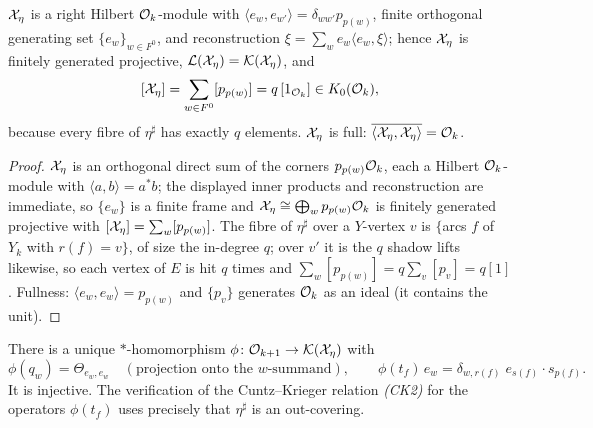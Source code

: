 \begin{lemma}\label{XVI:lem:fgp}
$\mathcal{X}_\eta$ is a right Hilbert $\mathcal{O}_k$-module with $\langle e_w,e_{w'}\rangle=\delta_{ww'}p_{p(w)}$,
finite orthogonal generating set $\{e_w\}_{w\in F^0}$, and reconstruction
$\xi=\sum_we_w\langle e_w,\xi\rangle$; hence $\mathcal{X}_\eta$ is finitely generated projective,
$\mathcal{L}(\mathcal{X}_\eta)=\mathcal{K}(\mathcal{X}_\eta)$, and
\[
[\mathcal{X}_\eta]=\sum_{w\in F^0}[p_{p(w)}]=q\,[1_{\mathcal{O}_k}]\in K_0(\mathcal{O}_k),
\]
because every fibre of $\eta^{\sharp}$ has exactly $q$ elements. $\mathcal{X}_\eta$ is full:
$\overline{\langle\mathcal{X}_\eta,\mathcal{X}_\eta\rangle}=\mathcal{O}_k$.
\end{lemma}

\begin{proof}
$\mathcal{X}_\eta$ is an orthogonal direct sum of the corners $p_{p(w)}\mathcal{O}_k$, each a Hilbert
$\mathcal{O}_k$-module with $\langle a,b\rangle=a^*b$; the displayed inner products and
reconstruction are immediate, so $\{e_w\}$ is a finite frame and $\mathcal{X}_\eta\cong\bigoplus_w
p_{p(w)}\mathcal{O}_k$ is finitely generated projective with $[\mathcal{X}_\eta]=\sum_w[p_{p(w)}]$. The
fibre of $\eta^{\sharp}$ over a $Y$-vertex $v$ is $\{$arcs $f$ of $Y_k$ with $r(f)=v\}$, of
size the in-degree $q$; over $v'$ it is the $q$ shadow lifts likewise, so each vertex of
$E$ is hit $q$ times and $\sum_w[p_{p(w)}]=q\sum_v[p_v]=q[1]$. Fullness: $\langle
e_w,e_w\rangle=p_{p(w)}$ and $\{p_v\}$ generates $\mathcal{O}_k$ as an ideal (it contains the unit).
\end{proof}

\begin{theorem}\label{XVI:thm:leftaction}
There is a unique $*$-homomorphism $\phi\colon\mathcal{O}_{k+1}\to\mathcal{K}(\mathcal{X}_\eta)$ with
\[
\phi(q_w)=\Theta_{e_w,e_w}\quad(\text{projection onto the }w\text{-summand}),\qquad
\phi(t_f)\,e_{w}=\delta_{w,r(f)}\;e_{s(f)}\cdot s_{p(f)} .
\]
It is injective. The verification of the Cuntz--Krieger relation \emph{(CK2)} for the
operators $\phi(t_f)$ uses precisely that $\eta^{\sharp}$ is an out-covering.
\end{theorem}

